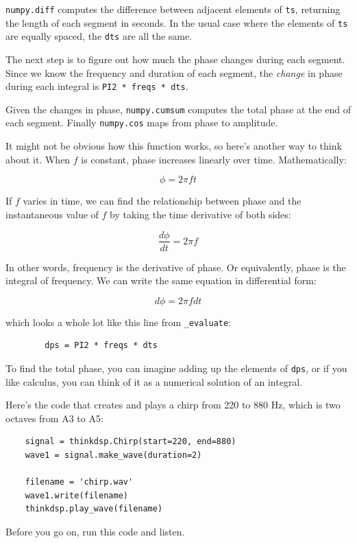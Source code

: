 \documentclass[12pt]{book}
\begin{document}
{\tt numpy.diff} computes the difference between adjacent elements
of {\tt ts}, returning the length of each segment in seconds.  In
the usual case where the elements of {\tt ts} are equally spaced,
the {\tt dts} are all the same.

The next step is to figure out how much the phase changes during
each segment.  Since we know the frequency and duration of each
segment, the {\em change} in phase during each integral is
{\tt PI2 * freqs * dts}.

Given the changes in phase, {\tt numpy.cumsum} computes the total
phase at the end of each segment.  Finally {\tt numpy.cos}
maps from phase to amplitude.

It might not be obvious how this function works, so here's another
way to think about it.  When $f$ is constant, phase increases linearly
over time.  Mathematically:

\[ \phi = 2 \pi f t \]

If $f$ varies in time, we can find the relationship between phase
and the instantaneous value of $f$ by taking the time derivative
of both sides:

\[ \frac{d\phi}{dt} = 2 \pi f \]

In other words, frequency is the derivative of phase.  Or equivalently,
phase is the integral of frequency.  We can write the same
equation in differential form:

\[ d\phi = 2 \pi f dt \]

which looks a whole lot like this line from \verb"_evaluate":

\begin{verbatim}
        dps = PI2 * freqs * dts
\end{verbatim}

To find the total phase, you can imagine adding up the elements of
{\tt dps}, or if you like calculus, you can think of it as a
numerical solution of an integral.

Here's the code that creates and plays a chirp from 220 to 880 Hz, which
is two octaves from A3 to A5:

\begin{verbatim}
    signal = thinkdsp.Chirp(start=220, end=880)
    wave1 = signal.make_wave(duration=2)

    filename = 'chirp.wav'
    wave1.write(filename)
    thinkdsp.play_wave(filename)
\end{verbatim}

Before you go on, run this code and listen.
\end{document}
